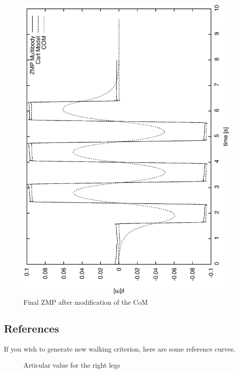\begin{figure}[htb]
\begin{center}
\includegraphics[width=\linewidth]{./figures/PatternGenerator/ThirdFigureZMPMB_Y}
\caption{Final ZMP after modification of the CoM}
\label{pic:ZMPMBcompensated}
\end{center}
\end{figure}
\clearpage

\subsection{References}
If you wish to generate new walking criterion, here are some reference curves.
\begin{figure}[htb]
\begin{center}
\caption{Articular value for the right legs}
\label{pic:ZMPMBcompensated}
\end{center}
\end{figure}

